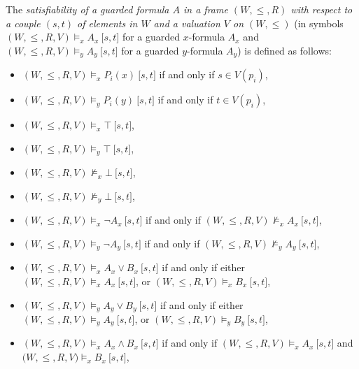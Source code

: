 \documentclass[draft]{article}
\begin{document}
%
%
%
%
The {\em satisfiability of a guarded formula $A$ in a frame $(W,{\leq},{R})$ with respect to a couple $(s,t)$ of elements in $W$ and a valuation $V$ on $(W,{\leq})$}\/ (in symbols $(W,{\leq},{R},V){\models_{x}}
%
%
%
%
%
%
%
$\linebreak$
%
%
%
%
%
%
A_{x}\ \lbrack s,t\rbrack$ for a guarded $x$-formula $A_{x}$ and $(W,{\leq},{R},V){\models_{y}}A_{y}\ \lbrack s,t\rbrack$ for a guarded $y$-formula $A_{y}$) is defined as follows:
%
%
\begin{itemize}
%
%
\item $(W,{\leq},{R},V){\models_{x}}P_{i}(x)\ \lbrack s,t\rbrack$ if and only if $s{\in}V(p_{i})$,
%
%
\item $(W,{\leq},{R},V){\models_{y}}P_{i}(y)\ \lbrack s,t\rbrack$ if and only if $t{\in}V(p_{i})$,
%
%
\item $(W,{\leq},{R},V){\models_{x}}\top\ \lbrack s,t\rbrack$,
%
%
\item $(W,{\leq},{R},V){\models_{y}}\top\ \lbrack s,t\rbrack$,
%
%
\item $(W,{\leq},{R},V){\not\models_{x}}\bot\ \lbrack s,t\rbrack$,
%
%
\item $(W,{\leq},{R},V){\not\models_{y}}\bot\ \lbrack s,t\rbrack$,
%
%
\item $(W,{\leq},{R},V){\models_{x}}{\neg}A_{x}\ \lbrack s,t\rbrack$ if and only if $(W,{\leq},{R},V){\not\models_{x}}A_{x}\ \lbrack s,t\rbrack$,
%
%
\item $(W,{\leq},{R},V){\models_{y}}{\neg}A_{y}\ \lbrack s,t\rbrack$ if and only if $(W,{\leq},{R},V){\not\models_{y}}A_{y}\ \lbrack s,t\rbrack$,
%
%
\item $(W,{\leq},{R},V){\models_{x}}A_{x}{\vee}B_{x}\ \lbrack s,t\rbrack$ if and only if either $(W,{\leq},{R},V){\models_{x}}A_{x}\ \lbrack s,t\rbrack$, or $(W,{\leq},{R},V){\models_{x}}B_{x}\ \lbrack s,t\rbrack$,
%
%
\item $(W,{\leq},{R},V){\models_{y}}A_{y}{\vee}B_{y}\ \lbrack s,t\rbrack$ if and only if either $(W,{\leq},{R},V){\models_{y}}A_{y}\ \lbrack s,t\rbrack$, or $(W,{\leq},{R},V){\models_{y}}B_{y}\ \lbrack s,t\rbrack$,
%
%
\item $(W,{\leq},{R},V){\models_{x}}A_{x}{\wedge}B_{x}\ \lbrack s,t\rbrack$ if and only if $(W,{\leq},{R},V){\models_{x}}A_{x}\ \lbrack s,t\rbrack$ and $(W,
%
%
%
%
%
%
%
$\linebreak$
%
%
%
%
%
%
{\leq},{R},V){\models_{x}}B_{x}\ \lbrack s,t\rbrack$,

\end{itemize}
\end{document}

